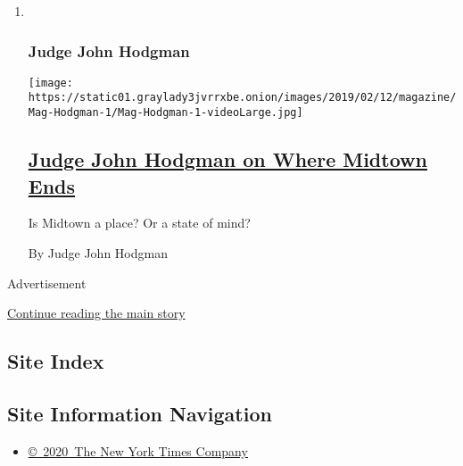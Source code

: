\begin{enumerate}
\def\labelenumi{\arabic{enumi}.}
\item ~
  \hypertarget{judge-john-hodgman}{%
  \subsubsection{Judge John Hodgman}\label{judge-john-hodgman}}

  \texttt{[image: https://static01.graylady3jvrrxbe.onion/images/2019/02/12/magazine/Mag-Hodgman-1/Mag-Hodgman-1-videoLarge.jpg]}

  \hypertarget{judge-john-hodgman-on-where-midtown-ends}{%
  \subsection{\texorpdfstring{\href{/2019/12/05/magazine/judge-john-hodgman-on-where-midtown-ends.html}{Judge
  John Hodgman on Where Midtown
  Ends}}{Judge John Hodgman on Where Midtown Ends}}\label{judge-john-hodgman-on-where-midtown-ends}}

  Is Midtown a place? Or a state of mind?

  By Judge John Hodgman
\end{enumerate}

Advertisement

\protect\hyperlink{after-mid1}{Continue reading the main story}

\hypertarget{site-index}{%
\subsection{Site Index}\label{site-index}}

\hypertarget{site-information-navigation}{%
\subsection{Site Information
Navigation}\label{site-information-navigation}}

\begin{itemize}
\tightlist
\item
  \href{https://help.nytimes3xbfgragh.onion/hc/en-us/articles/115014792127-Copyright-notice}{©~2020~The
  New York Times Company}
\end{itemize}

